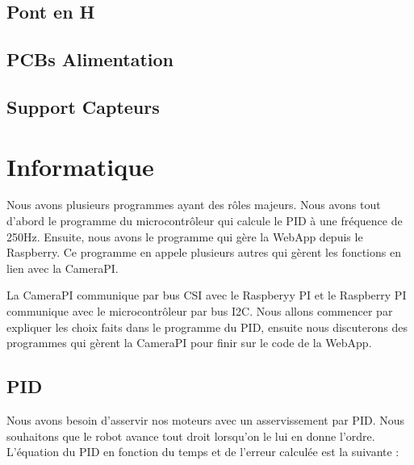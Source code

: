 \documentclass[
	a4paper,									%
	11pt,										%
	twoside,									%
	openright,									%
	notitlepage,									%
	parskip=half,								%
]{scrreprt}										%
\begin{document}
\section{Pont en H}



\section{PCBs Alimentation}



\section{Support Capteurs}




\chapter{Informatique}

Nous avons plusieurs programmes ayant des rôles majeurs. Nous avons tout d'abord le programme du 
microcontrôleur qui calcule le PID à une fréquence de 250Hz. Ensuite, nous avons le programme qui gère
la WebApp depuis le Raspberry. Ce programme en appele plusieurs autres qui gèrent les fonctions en lien 
avec la CameraPI. \par

La CameraPI communique par bus CSI avec le Raspberyy PI et le Raspberry PI communique avec le microcontrôleur
par bus I2C. Nous allons commencer par expliquer les choix faits dans le programme du PID, ensuite nous discuterons
des programmes qui gèrent la CameraPI pour finir sur le code de la WebApp. \par


\section{PID}

Nous avons besoin d'asservir nos moteurs avec un asservissement par PID. Nous souhaitons que le robot avance
tout droit lorsqu'on le lui en donne l'ordre. L'équation du PID en fonction du temps et de l'erreur calculée 
est la suivante : 
\end{document}
